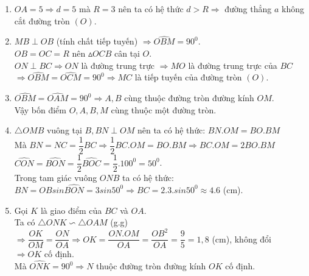 \begin{ex}
{\begin{enumerate}
\item $OA=5 \Rightarrow d=5$ mà $R=3$ nên ta có hệ thức $d>R \Rightarrow$ đường thẳng $a$ không cắt đường tròn $(O)$.
\item 
$MB \perp OB$ (tính chất tiếp tuyến) $\Rightarrow \widehat{OBM}=90^0$.\\
$OB=OC=R$ nên $\vartriangle OCB$ cân tại $O$.\\
$ON\perp BC\Rightarrow ON$ là đường trung trực $\Rightarrow MO$ là đường trung trực của $BC$\\ $\Rightarrow \widehat{OBM}=\widehat{OCM}=90^0 \Rightarrow MC$ là tiếp tuyến của đường tròn $(O)$.
\item $\widehat{OBM}=\widehat{OAM}=90^0 \Rightarrow A,B$ cùng thuộc đường tròn đường kính $OM$.\\
Vậy bốn điểm $O,A,B,M$ cùng thuộc một đường tròn.
\item $\triangle OMB$ vuông tại $B,BN\perp OM$ nên ta có hệ thức: $BN.OM=BO.BM$\\ Mà $BN=NC=\dfrac{1}{2}BC \Rightarrow \dfrac{1}{2}BC.OM=BO.BM \Rightarrow BC.OM=2BO.BM$\\
$\widehat{CON}=\widehat{BON}=\dfrac{1}{2}\widehat{BOC}=\dfrac{1}{2}.100^0=50^0$.\\
Trong tam giác vuông $ONB$ ta có hệ thức:\\
$BN=OBsin\widehat{BON}=3sin50^0\Rightarrow BC=2.3.sin50^0 \approx 4.6$ (cm).
\item Gọi $K$ là giao điểm của $BC$ và $OA$.\\
Ta có $\triangle ONK \backsim \triangle OAM$ (g.g)\\ $\Rightarrow \dfrac{OK}{OM}=\dfrac{ON}{OA} \Rightarrow OK=\dfrac{ON.OM}{OA}=\dfrac{OB^2}{OA}=\dfrac{9}{5}=1,8$ (cm), không đổi\\
$\Rightarrow OK$ cố định.\\
Mà $\widehat{ONK}=90^0 \Rightarrow N$ thuộc đường tròn đường kính $OK$ cố định.
\end{enumerate}
}
\end{ex}

